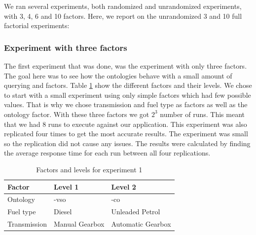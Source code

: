 \documentclass{llncs}
\begin{document}
We ran several experiments, both randomized and unrandomized
experiments, with 3, 4, 6 and 10 factors. Here, we report on the
unrandomized 3 and 10 full factorial experiments:
  
\subsubsection{Experiment with three factors}
The first experiment that was done, was the experiment with only three
factors. The goal here was to see how the ontologies behave with a
small amount of querying and factors.  Table \ref{facandlevExp1} show
the different factors and their levels. We chose to start with a small
experiment using only simple factors which had few possible
values. That is why we chose transmission and fuel type as factors as
well as the ontology factor. With these three factors we got $2^3$
number of runs.  This meant that we had 8 runs to execute against our
application. This experiment was also replicated four times to get the
most accurate results. The experiment was small so the replication did
not cause any issues.  The results were calculated by finding the
average response time for each run between all four replications.

\begin{table}[H]
\begin{center}
    \begin{tabular}{ | l | l l |}
    \hline
    {\bf Factor} & {\bf Level 1} & {\bf Level 2} \\ \hline
	Ontology & -vso & -co \\ \hline 
	Fuel type & Diesel & Unleaded Petrol \\ \hline 
	Transmission & Manual Gearbox & Automatic Gearbox \\ \hline 
    \end{tabular}
\end{center}
\caption{Factors and levels for experiment 1}\label{facandlevExp1}
\end{table}
\end{document}
